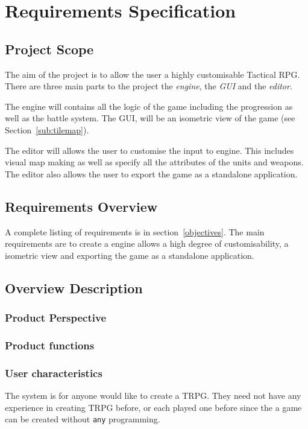 \section{Requirements Specification}

\subsection{Project Scope}
\label{sub:project_scope}

The aim of the project is to allow the user a highly customisable Tactical RPG.  There are three main parts to the project the \emph{engine}, the \emph{GUI} and the \emph{editor}.

The engine will contains all the logic of the game including the progression as well as the battle system. The GUI, will be an isometric view of the game (see Section~\ref{sub:tilemap}). 

The editor will allows the user to customise the input to engine. This includes visual map making as well as specify all the attributes of the units and weapons.  The editor also allows the user to export the game as a standalone application.

\subsection{Requirements Overview}
\label{sub:overview}
A complete listing of requirements is in section~\ref{objectives}. The main requirements are to create a engine allows a high degree of customisability, a isometric view and exporting the game as a standalone application.  

\subsection{Overview Description}
\subsubsection{Product Perspective}

\subsubsection{Product functions}

\subsubsection{User characteristics}
The system is for anyone would like to create a TRPG.  They need not have any experience in creating TRPG before, or each played one before since the a game can be created without \texttt{any} programming. 

